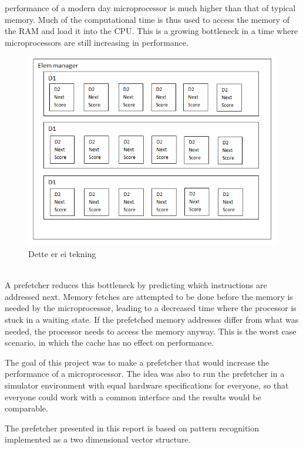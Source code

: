  performance of a modern day microprocessor is much higher than that of typical memory. Much of the computational time is thus used to access the memory of the RAM and load it into the CPU. This is a growing bottleneck in a time where microprocessors are still increasing in performance. 
\\
\begin{figure}[h!]
	\includegraphics[scale = 0.5]{table3.png}
	\caption{Dette er ei tekning}
\end{figure}
\\
A prefetcher reduces this bottleneck by predicting which instructions are addressed next. Memory fetches are attempted to be done before the memory is needed by the microprocessor, leading to a decreased time where the processor is stuck in a waiting state. If the prefetched memory addresses differ from what was needed, the processor needs to access the memory anyway. This is the worst case scenario, in which the cache has no effect on performance.

The goal of this project was to make a prefetcher that would increase the performance of a microprocessor. The idea was also to run the prefetcher in a simulator environment with equal hardware specifications for everyone, so that everyone could work with a common interface and the results would be comparable. 

The prefetcher presented in this report is based on pattern recognition implemented as a two dimensional vector structure.
